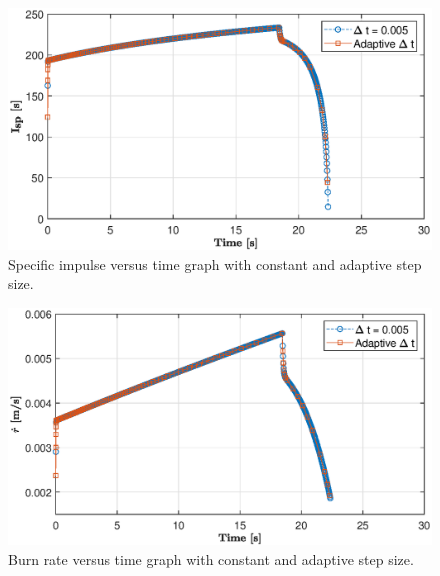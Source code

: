\documentclass[letterpaper,12pt]{article}
\begin{document}
\newpage

\begin{figure}[!h]
	\centering
	\includegraphics[height = 8.5 cm]{graphs/bonus_isp.eps}
	\caption{Specific impulse versus time graph with constant and adaptive step size.}
	\label{fig:bonus_isp}
\end{figure}

\begin{figure}[!h]
	\centering
	\includegraphics[height = 8.5 cm]{graphs/bonus_rdot.eps}
	\caption{Burn rate versus time graph with constant and adaptive step size.}
	\label{fig:bonus_rdot}
\end{figure}

\end{document}
